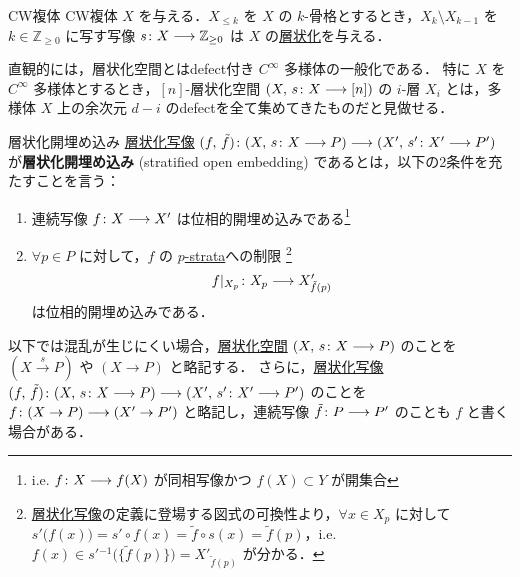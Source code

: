 \documentclass[TQFT_main]{subfiles}
\begin{document}
\begin{myexample}[label=ex:str-CW]{CW複体}
    CW複体 $X$ を与える．$X_{\le k}$ を $X$ の $k$-骨格とするとき，$X_k \setminus X_{k-1}$ を $k \in \mathbb{Z}_{\ge 0}$ に写す写像 $s \colon X \longrightarrow \mathbb{Z}_{\ge 0}$ は $X$ の\hyperref[def:stratified-space]{層状化}を与える．
\end{myexample}

直観的には，層状化空間とはdefect付き $C^\infty$ 多様体の一般化である．
特に $X$ を $C^\infty$ 多様体とするとき，$[n]$-層状化空間 $(X,\, s \colon X \longrightarrow [n])$ の $i$-層 $X_i$ とは，多様体 $X$ 上の余次元 $d-i$ のdefectを全て集めてきたものだと見做せる．

\begin{mydef}[label=def:strat-emb]{層状化開埋め込み}
    \hyperref[def:stratified-space]{層状化写像} $(f,\, \tilde{f}) \colon (X,\, s \colon X \longrightarrow P) \longrightarrow (X',\, s' \colon X' \longrightarrow P')$ が\textbf{層状化開埋め込み} (stratified open embedding) であるとは，以下の2条件を充たすことを言う：
    \begin{enumerate}
        \item 連続写像 $f \colon X \longrightarrow X'$ は位相的開埋め込みである\footnote{i.e. $f \colon X \longrightarrow f(X)$ が同相写像かつ $f(X) \subset Y$ が開集合}
        \item $\forall p \in P$ に対して，$f$ の \hyperref[def:stratified-space]{$p$-strata}への制限
        \footnote{\hyperref[def:stratified-space]{層状化写像}の定義に登場する図式の可換性より，$\forall x \in X_p$ に対して $s' \bigl( f(x) \bigr) = s' \circ f (x) = \tilde{f} \circ s (x) = \tilde{f}(p)$，i.e. $f(x) \in s'{}^{-1} \bigl( \{\tilde{f}(p)\} \bigr) = X'_{\tilde{f}(p)}$ が分かる．}
        \begin{align}
            f|_{X_p} \colon X_p \longrightarrow X'_{\tilde{f}(p)}
        \end{align}
        は位相的開埋め込みである．
    \end{enumerate}
\end{mydef}

\begin{marker}
    以下では混乱が生じにくい場合，\hyperref[def:stratified-space]{層状化空間} $(X,\, s \colon X \longrightarrow P)$ のことを $(X \xrightarrow{s} P)$ や $(X \to P)$ と略記する．
    さらに，\hyperref[def:stratified-space]{層状化写像} $(f,\, \tilde{f}) \colon (X,\, s \colon X \longrightarrow P) \longrightarrow (X',\, s' \colon X' \longrightarrow P')$ のことを $f \colon (X \to P) \longrightarrow (X' \to P')$ と略記し，連続写像 $\tilde{f} \colon P \longrightarrow P'$ のことも $f$ と書く場合がある．
\end{marker}
\end{document}
